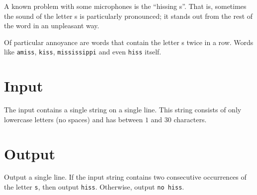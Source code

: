 
A known problem with some microphones is the ``hissing s''. That is, sometimes
the sound of the letter s is particularly pronounced; it stands out from
the rest of the word in an unpleasant way.

Of particular annoyance are words that contain the letter s twice in a row.
Words like \texttt{amiss}, \texttt{kiss}, \texttt{mississippi} and even \texttt{hiss}
itself.

\section*{Input}

The input contains a single string on a single line. This string
consists of only lowercase letters (no spaces) and has between $1$ and $30$
characters.

\section*{Output}

Output a single line. If the input string contains two consecutive occurrences
of the letter \texttt{s}, then output \texttt{hiss}. Otherwise, output
\texttt{no hiss}.
